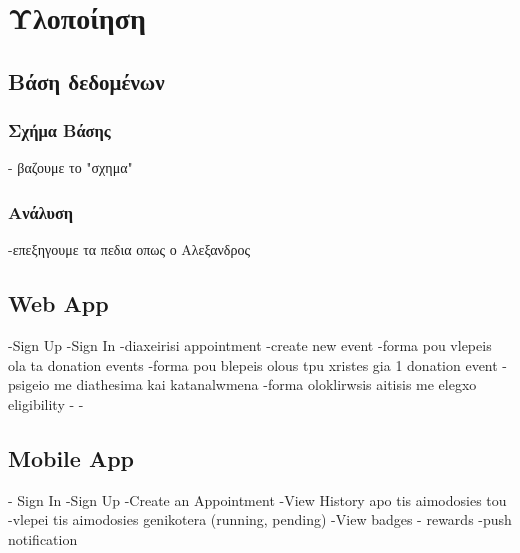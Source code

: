 \graphicspath{ {Figures/implementation/} }
\chapter{Υλοποίηση}\label{ch:Implementation}




\section{Βάση δεδομένων}
	\subsection{Σχήμα Βάσης}
	- βαζουμε το "σχημα"
	\subsection{Ανάλυση}
	-επεξηγουμε τα πεδια οπως ο Αλεξανδρος


\section{Web App}
	-Sign Up	
	-Sign In
	-diaxeirisi appointment
	-create new event
	-forma pou vlepeis ola ta donation events
	-forma pou blepeis olous tpu xristes gia 1 donation event
	- psigeio me diathesima kai katanalwmena
	-forma oloklirwsis aitisis me elegxo eligibility
	-
	-


\section{Mobile App}

	- Sign In
	 -Sign Up
	 -Create an Appointment
	 -View History apo tis aimodosies tou
	 -vlepei tis aimodosies genikotera (running, pending)
	 -View badges - rewards
	 -push notification
	
		

